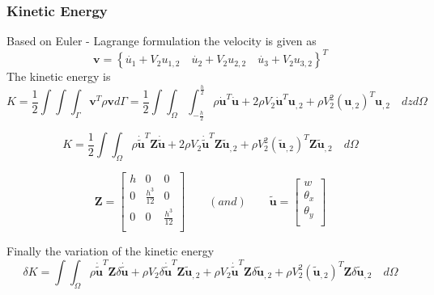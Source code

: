 \documentclass[9pt]{beamer}
\newcommand{\vect}[1]{\boldsymbol{#1}}
\begin{document}
\begin{frame}\frametitle{Kinetic Energy}
Based on Euler - Lagrange formulation the velocity is given as
\begin{equation*}\label{eq:v}
  \mathbf{v}=\left\{ \dot{u_1}+V_2u_{1,2} \quad  \dot{u_2}+V_2u_{2,2} \quad  \dot{u_3}+V_2u_{3,2} \right\}^T
\end{equation*}
The kinetic energy is 
\begin{equation*}\label{eq:KE}
K = \frac{1}{2} \int \int \int_{\Gamma} \mathbf{v}^T\rho\mathbf{v} d\Gamma
=\frac{1}{2} 
\int \int_\Omega \int_{-\frac{h}{2}}^{\frac{h}{2}} 
\rho \vect{ \dot{u}} ^T    \vect{ \dot{u}}
+
2 \rho  V_2 \vect{ \dot{u}} ^T   \vect{u}_{,2}
+
\rho  V_2^2  (\vect{u}_{,2})^T   \vect{u}_{,2}
\quad
 dz 
 d\Omega
\end{equation*}

\begin{equation*}
K=\frac{1}{2} 
\int \int_\Omega
\rho  \vect{\dot{\tilde{u}}}^T  \vect{Z}    \vect{\dot{\tilde{u}}}
+
2 \rho  V_2 \vect{\dot{\tilde{u}}}^T  \vect{Z}     \vect{\tilde{u}}_{,2}
+
\rho  V_2^2 (\vect{\tilde{u}}_{,2})^T   \vect{Z}      \vect{\tilde{u}}_{,2}
\quad
 d\Omega
\end{equation*}

\begin{equation*}
 \vect{Z}  = 
 \begin{bmatrix}
h   &  0 & 0 \\
0   &  \frac{h^3}{12}& 0 \\
0   &  0 & \frac{h^3}{12} \\
\end{bmatrix}
\qquad
(and)
\qquad
 \vect{\tilde{u}}  = 
 \begin{bmatrix}
w   \\
\theta_x    \\
\theta_y   \\
\end{bmatrix}
\end{equation*}

Finally the variation of the kinetic energy
\begin{equation*}\label{eq:vr_KE}
\delta K
= 
\int \int_\Omega
\rho  \vect{\dot{\tilde{u}}}^T  \vect{Z}    \delta \vect{\dot{\tilde{u}}}
+
\rho  V_2 \delta \vect{\dot{\tilde{u}}}^T  \vect{Z}      \vect{\tilde{u}}_{,2}
+
\rho  V_2 \vect{\dot{\tilde{u}}}^T  \vect{Z}     \delta \vect{\tilde{u}}_{,2}
+ 
\rho  V_2^2 (\vect{\tilde{u}}_{,2})^T   \vect{Z}      \delta \vect{\tilde{u}}_{,2}
\quad
 d\Omega
\end{equation*}

\end{frame}
\end{document}
